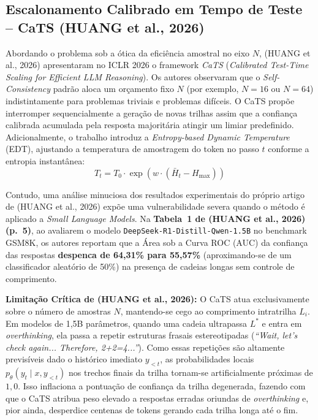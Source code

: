 \documentclass[9pt,conference]{IEEEtran}
\begin{document}
\subsection{Escalonamento Calibrado em Tempo de Teste -- CaTS (HUANG et al., 2026)}

Abordando o problema sob a \'{o}tica da efici\^{e}ncia amostral no eixo $N$, (HUANG et al., 2026) apresentaram no ICLR 2026 o framework \textit{CaTS} (\textit{Calibrated Test-Time Scaling for Efficient LLM Reasoning}). Os autores observaram que o \textit{Self-Consistency} padr\~{a}o aloca um or\c{c}amento fixo $N$ (por exemplo, $N=16$ ou $N=64$) indistintamente para problemas triviais e problemas dif\'{i}ceis. O CaTS prop\~{o}e interromper sequencialmente a gera\c{c}\~{a}o de novas trilhas assim que a confian\c{c}a calibrada acumulada pela resposta majorit\'{a}ria atingir um limiar predefinido. Adicionalmente, o trabalho introduz a \textit{Entropy-based Dynamic Temperature} (EDT), ajustando a temperatura de amostragem do token no passo $t$ conforme a entropia instant\^{a}nea:
\begin{equation}
T_t = T_0 \cdot \exp\left(w \cdot (\bar{H}_t - H_{\max})\right)
\label{eq:cats_edt}
\end{equation}

Contudo, uma an\'{a}lise minuciosa dos resultados experimentais do pr\'{o}prio artigo de (HUANG et al., 2026) exp\~{o}e uma vulnerabilidade severa quando o m\'{e}todo \'{e} aplicado a \textit{Small Language Models}. Na \textbf{Tabela~1 de (HUANG et al., 2026) (p.~5)}, ao avaliarem o modelo \texttt{DeepSeek-R1-Distill-Qwen-1.5B} no benchmark GSM8K, os autores reportam que a \'{A}rea sob a Curva ROC (AUC) da confian\c{c}a das respostas \textbf{despenca de 64,31\% para 55,57\%} (aproximando-se de um classificador aleat\'{o}rio de 50\%) na presen\c{c}a de cadeias longas sem controle de comprimento.

\textbf{Limita\c{c}\~{a}o Cr\'{i}tica de (HUANG et al., 2026):} O CaTS atua exclusivamente sobre o n\'{u}mero de amostras $N$, mantendo-se cego ao comprimento intratrilha $L_i$. Em modelos de 1,5B par\^{a}metros, quando uma cadeia ultrapassa $L^*$ e entra em \textit{overthinking}, ela passa a repetir estruturas frasais estereotipadas (\textit{``Wait, let's check again... Therefore, 2+2=4...''}). Como essas repeti\c{c}\~{o}es s\~{a}o altamente previs\'{i}veis dado o hist\'{o}rico imediato $y_{<t}$, as probabilidades locais $p_\theta(y_t \mid x, y_{<t})$ nos trechos finais da trilha tornam-se artificialmente pr\'{o}ximas de $1,0$. Isso inflaciona a pontua\c{c}\~{a}o de confian\c{c}a da trilha degenerada, fazendo com que o CaTS atribua peso elevado a respostas erradas oriundas de \textit{overthinking} e, pior ainda, desperdice centenas de tokens gerando cada trilha longa at\'{e} o fim.
\end{document}
